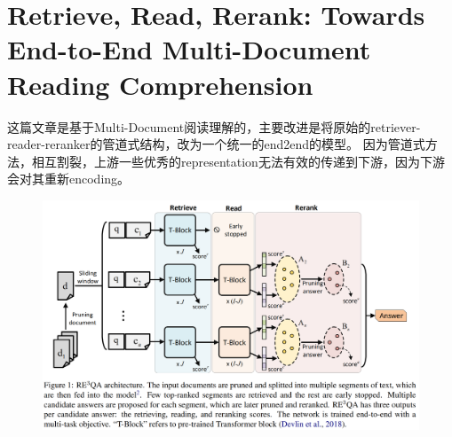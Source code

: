 \documentclass[a4paper,UTF8]{article}
\numberwithin{equation}{section}
\begin{document}
\section{Retrieve, Read, Rerank: Towards End-to-End Multi-Document Reading Comprehension}
这篇文章是基于Multi-Document阅读理解的，主要改进是将原始的retriever-reader-reranker的管道式结构，改为一个统一的end2end的模型。
因为管道式方法，相互割裂，上游一些优秀的representation无法有效的传递到下游，因为下游会对其重新encoding。
\begin{figure}[H]
	\centering
	\includegraphics[width=\textwidth]{7-1.png}
\end{figure}
\end{document}
